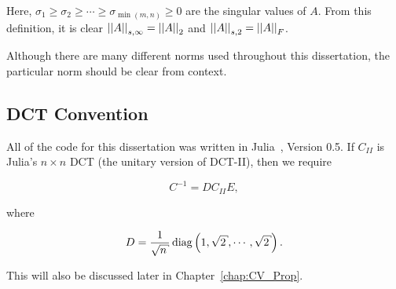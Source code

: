 \noindent
Here, $\sigma_{1}\ge\sigma_{2}\ge\cdots\ge\sigma_{\min(m,n)}\ge0$
are the singular values of $A$.
From this definition, it is clear $\left| \left| A \right| \right|_{s,\infty} = \left| \left| A \right| \right|_{2}$
and $\left| \left| A \right| \right|_{s,2} = \left| \left| A \right| \right|_{F}$.

Although there are many different norms used throughout this dissertation,
the particular norm should be clear from context.



\subsection{DCT Convention}
\label{ssec:kar_dct}

All of the code for this dissertation was written in Julia~\cite{julialang},
Version 0.5.
If $C_{II}$ is Julia's $n\times n$ DCT (the unitary version of DCT-II),
then we require

\begin{equation}
    C^{-1} = DC_{II}E,
\end{equation}

\noindent
where

\begin{equation}
    D = \frac{1}{\sqrt{n}}\diag\parens{1,\sqrt{2},\cdots,\sqrt{2}}.
\end{equation}

\noindent
This will also be discussed later in Chapter~\ref{chap:CV_Prop}.



